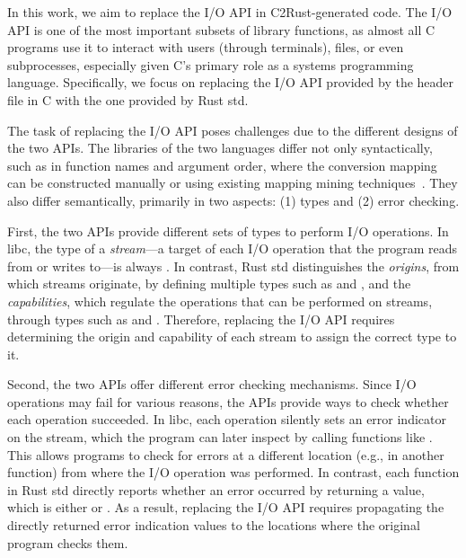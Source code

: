 In this work, we aim to replace the I/O API in C2Rust-generated code.
%
The I/O API is one of the most important subsets of library functions, as almost
all C programs use it to interact with users (through terminals), files, or even
subprocesses, especially given C's primary role as a systems programming
language.
%
Specifically, we focus on replacing the I/O API provided by the 
header file in C with the one provided by Rust std.

The task of replacing the I/O API poses challenges due to the different designs
of the two APIs.
%
The libraries of the two languages differ not only syntactically, such as in
function names and argument order, where the conversion mapping can be
constructed manually or using existing mapping mining
techniques~\cite{zhong2010mining, nguyen2014statistical, meng2012history}.
%
They also differ semantically, primarily in two aspects: (1) types and (2) error
checking.

First, the two APIs provide different sets of types to perform I/O operations.
%
In libc, the type of a \emph{stream}---a target of each I/O operation that the
program reads from or writes to---is always .
%
In contrast, Rust std distinguishes the \emph{origins}, from which streams
originate, by defining multiple types such as  and ,
%
and the \emph{capabilities}, which regulate the operations that can be performed
on streams, through types such as  and .
%
Therefore, replacing the I/O API requires determining the origin and capability
of each stream to assign the correct type to it.

Second, the two APIs offer different error checking mechanisms.
%
Since I/O operations may fail for various reasons,
%
%
the APIs provide ways to check whether each operation succeeded.
%
In libc, each operation silently sets an error indicator on the stream, which
the program can later inspect by calling functions like .
%
This allows programs to check for errors at a different location (e.g., in
another function) from where the I/O operation was performed.
%
In contrast, each function in Rust std directly reports whether an error
occurred by returning a  value, which is either  or .
%
As a result, replacing the I/O API requires propagating the directly returned error
indication values to the locations where the original program checks them.

